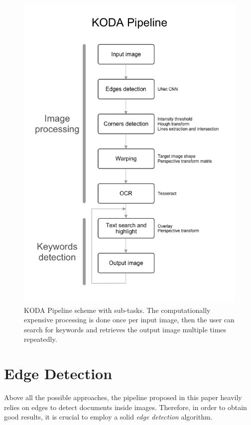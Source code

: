 \documentclass[a4paper]{article}
\begin{document}
\begin{figure}[!htbp]
	\includegraphics[width=\linewidth]{Pipeline.png}
	\caption{KODA Pipeline scheme with sub-tasks. The computationally expensive processing is done once per input image, then the user can search for keywords and retrieves the output image multiple times repeatedly.}
	\label{fig:pipeline}
\end{figure}



\section{Edge Detection}

Above all the possible approaches, the pipeline proposed in this paper heavily
relies on edges to detect documents inside images. Therefore, in order to obtain
good results, it is crucial to employ a solid \textit{edge detection} algorithm.
\end{document}
